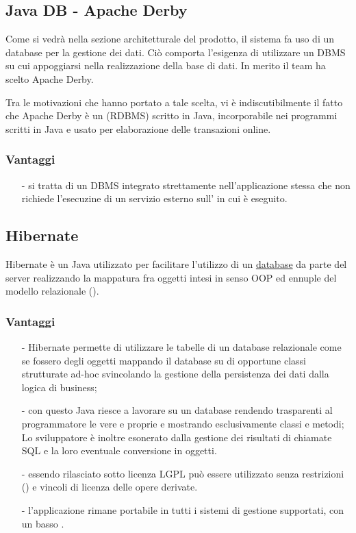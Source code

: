 \subsection{Java DB - Apache Derby}
Come si vedrà nella sezione architetturale del prodotto, il sistema fa uso di un database per la gestione dei dati. Ciò comporta l'esigenza di utilizzare un DBMS su cui appoggiarsi nella realizzazione della base di dati. In merito il team ha scelto Apache Derby.

Tra le motivazioni che hanno portato a tale scelta, vi è indiscutibilmente il fatto che Apache Derby è un  (RDBMS) scritto in Java, incorporabile nei programmi scritti in Java e usato per elaborazione delle transazioni online.

\subsubsection*{Vantaggi}
\begin{itemize}[noitemsep,nolistsep]
  \item[-] si tratta di un DBMS  integrato strettamente nell'applicazione stessa che non richiede l'esecuzine di un servizio esterno sull' in cui è eseguito.
\end{itemize}

\subsection{Hibernate}\label{sec:hibernate}

Hibernate è un  Java utilizzato per facilitare l'utilizzo di un \underline{database} da parte del server realizzando la mappatura fra oggetti intesi in senso OOP ed ennuple del modello relazionale ().

\subsubsection*{Vantaggi}
\begin{itemize}[noitemsep,nolistsep]
\item[-] Hibernate permette di utilizzare le tabelle di un database relazionale come se fossero degli oggetti mappando il database su di opportune classi strutturate ad-hoc svincolando la gestione della persistenza dei dati dalla logica di business;
\item[-] con questo  Java riesce a lavorare su un database rendendo trasparenti al programmatore le vere e proprie  e mostrando esclusivamente classi e metodi; Lo sviluppatore è inoltre esonerato dalla gestione dei risultati di chiamate SQL e la loro eventuale conversione in oggetti.
\item[-] essendo rilasciato sotto licenza LGPL può essere utilizzato senza restrizioni () e vincoli di licenza delle opere derivate.
\item[-] l'applicazione rimane portabile in tutti i sistemi di gestione supportati, con un basso .
\end{itemize}
\clearpage

